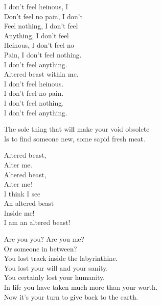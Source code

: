 I don't feel heinous, I \\
Don't feel no pain, I don't \\
Feel nothing, I don't feel \\
Anything, I don't feel \\
Heinous, I don't feel no \\
Pain, I don't feel nothing. \\
I don't feel anything. \\
Altered beast within me. \\

I don't feel heinous. \\
I don't feel no pain. \\
I don't feel nothing. \\
I don't feel anything. \\


The sole thing that will make your void obsolete \\
Is to find someone new, some sapid fresh meat. \\


Altered beast, \\
Alter me. \\
Altered beast, \\
Alter me! \\

I think I see \\
An altered beast \\
Inside me! \\

I am an altered beast! \\





Are you you? Are you me? \\
Or someone in between? \\
You lost track inside the labyrinthine. \\

You lost your will and your sanity. \\
You certainly lost your humanity. \\

In life you have taken much more than your worth. \\
Now it's your turn to give back to the earth. \\

